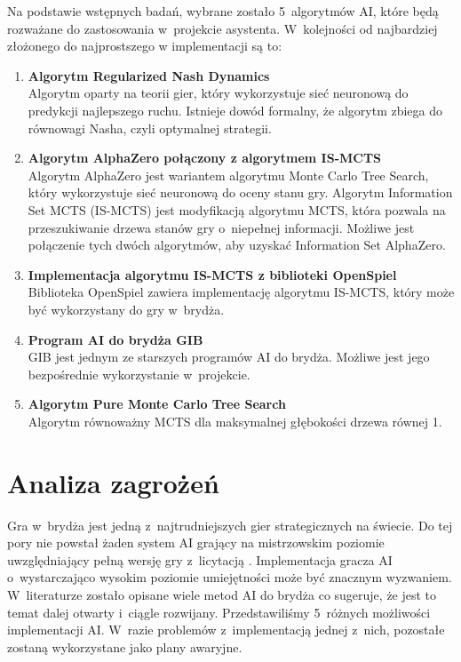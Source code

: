 Na podstawie wstępnych badań, wybrane zostało 5~algorytmów AI,
które będą rozważane do zastosowania w~projekcie asystenta.
W~kolejności od najbardziej złożonego do
najprostszego w implementacji są to:
\begin{enumerate}
  \item \textbf{Algorytm Regularized Nash Dynamics \cite{doi:10.1126/science.add4679}}\\
        Algorytm oparty na teorii gier, który wykorzystuje sieć neuronową do
        predykcji najlepszego ruchu. Istnieje dowód formalny, że algorytm
        zbiega do równowagi Nasha, czyli optymalnej strategii.

  \item \textbf{Algorytm AlphaZero \cite{AlphaZeroPaper} połączony z algorytmem IS-MCTS \cite{6203567}}\\
        Algorytm AlphaZero jest wariantem algorytmu Monte Carlo Tree Search,
        który wykorzystuje sieć neuronową do oceny stanu gry.
        Algorytm Information Set MCTS (IS-MCTS) jest modyfikacją algorytmu MCTS, która pozwala na
        przeszukiwanie drzewa stanów gry o~niepełnej informacji.
        Możliwe jest połączenie tych dwóch algorytmów, aby uzyskać
        Information Set AlphaZero.

  \item \textbf{Implementacja algorytmu IS-MCTS z biblioteki OpenSpiel \cite{LanctotEtAl2019OpenSpiel}}\\
        Biblioteka OpenSpiel zawiera implementację algorytmu IS-MCTS,
        który może być wykorzystany do gry w~brydża.

  \item \textbf{Program AI do brydża GIB \cite{Ginsberg1999GIBST}}\\
        GIB jest jednym ze starszych programów AI do brydża. Możliwe jest
        jego bezpośrednie wykorzystanie w~projekcie.

  \item \textbf{Algorytm Pure Monte Carlo Tree Search \cite{pmcts}}\\
        Algorytm równoważny MCTS dla maksymalnej głębokości drzewa równej 1.
\end{enumerate}



\section{Analiza zagrożeń}

Gra w~brydża jest jedną z~najtrudniejszych gier strategicznych na świecie.
Do tej pory nie powstał żaden system AI grający na mistrzowskim poziomie
uwzględniający pełną wersję gry z~licytacją \cite{Bethe2021AdvancesIC}.
Implementacja gracza AI o~wystarczająco wysokim poziomie umiejętności może
być znacznym wyzwaniem. W~literaturze zostało opisane wiele metod AI do brydża
\cite{Zhang2019DesignAD,Zhang2022TheSO,Zhang2022AIEB,Ginsberg1999GIBST}
co sugeruje, że jest to temat dalej otwarty i~ciągle rozwijany.
Przedstawiliśmy 5~różnych możliwości implementacji AI.
W~razie problemów z~implementacją jednej z~nich, pozostałe
zostaną wykorzystane jako plany awaryjne.

